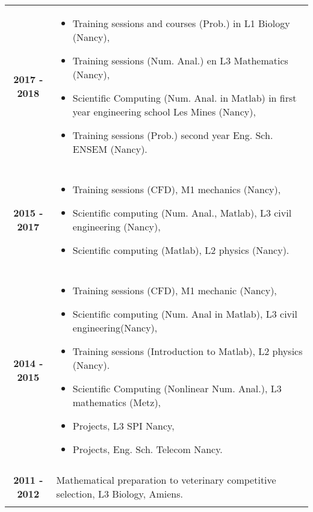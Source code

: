 \documentclass[10pt,a4paper]{report}
\begin{document}
\noindent
\begin{center}
\begin{tabular}{c p{12cm}}
\textbf{2017 - 2018} & \begin{itemize}
\item Training sessions and courses (Prob.) in L1 Biology (Nancy),
\item Training sessions (Num. Anal.) en L3 Mathematics (Nancy),
\item Scientific Computing (Num. Anal. in Matlab) in first year engineering school Les Mines (Nancy),
\item Training sessions (Prob.) second year Eng. Sch. ENSEM (Nancy).
\end{itemize}\\

& \\

\textbf{2015 - 2017} & \begin{itemize}
\item Training sessions (CFD), M1 mechanics (Nancy),
\item Scientific computing (Num. Anal., Matlab), L3 civil engineering (Nancy),
\item Scientific computing (Matlab), L2 physics (Nancy).
\end{itemize}\\

& \\

\textbf{2014 - 2015} & \begin{itemize}
\item Training sessions (CFD), M1 mechanic (Nancy),
\item Scientific computing (Num. Anal in Matlab), L3 civil engineering(Nancy),
\item Training sessions (Introduction to Matlab), L2 physics (Nancy).
\item Scientific Computing (Nonlinear Num. Anal.), L3 mathematics (Metz),
\item Projects, L3 SPI Nancy,
\item Projects, Eng. Sch. Telecom Nancy.
\end{itemize}\\

& \\

\textbf{2011 - 2012} & Mathematical preparation to veterinary competitive selection, L3 Biology, Amiens.\\

& \\
\end{tabular}
\end{center}
\end{document}

